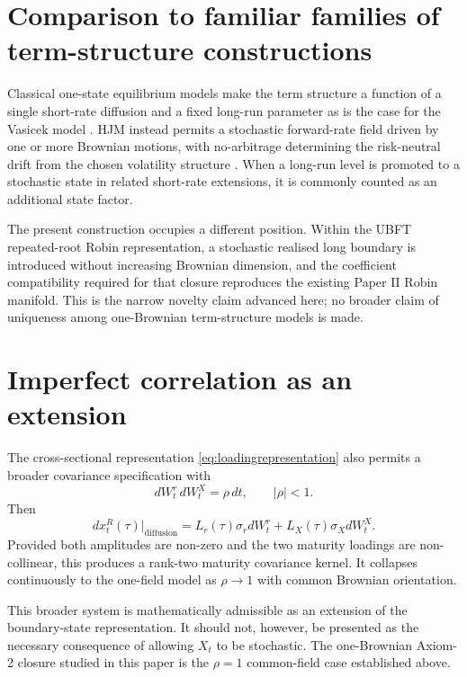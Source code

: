 \documentclass[11pt]{article}
\numberwithin{equation}{section}
\begin{document}
\section{Comparison to familiar families of term-structure constructions}

Classical one-state equilibrium models make the term structure a function of a single short-rate diffusion and a fixed long-run parameter as is the case for the Vasicek model \cite{Vasicek1977}. HJM instead permits a stochastic forward-rate field driven by one or more Brownian motions, with no-arbitrage determining the risk-neutral drift from the chosen volatility structure \cite{HJM1992}. When a long-run level is promoted to a stochastic state in related short-rate extensions, it is commonly counted as an additional state factor.

The present construction occupies a different position. Within the UBFT repeated-root Robin representation, a stochastic realised long boundary is introduced without increasing Brownian dimension, and the coefficient compatibility required for that closure reproduces the existing Paper II Robin manifold. This is the narrow novelty claim advanced here; no broader claim of uniqueness among one-Brownian term-structure models is made.

\section{Imperfect correlation as an extension}

The cross-sectional representation \eqref{eq:loadingrepresentation} also permits a broader covariance specification with
\begin{equation}
 dW_t^r\,dW_t^X=\rho\,dt,
 \qquad |\rho|<1.
\end{equation}
Then
\begin{equation}
 dx_t^R(\tau)\big|_{\mathrm{diffusion}}
 =L_r(\tau)\sigma_r dW_t^r+L_X(\tau)\sigma_XdW_t^X.
\end{equation}
Provided both amplitudes are non-zero and the two maturity loadings are non-collinear, this produces a rank-two maturity covariance kernel. It collapses continuously to the one-field model as $\rho\to1$ with common Brownian orientation.

This broader system is mathematically admissible as an extension of the boundary-state representation. It should not, however, be presented as the necessary consequence of allowing $X_t$ to be stochastic. The one-Brownian Axiom-2 closure studied in this paper is the $\rho=1$ common-field case established above.
\end{document}
